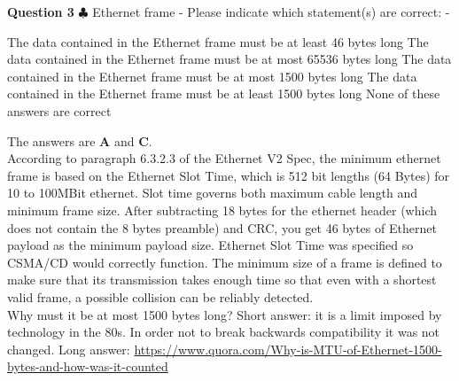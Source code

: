 \documentclass[en]{sourcefiles/eplexam}
\newcounter{choice}
\renewcommand\thechoice{\textbf{\Alph{choice}}}
\newcommand\choicelabel{\thechoice$\quad$}
\newenvironment{choices}%
  {\list{\choicelabel}%
     {\usecounter{choice}\def\makelabel##1{\hss\llap{##1}}%
       \settowidth{\leftmargin}{W.\hskip\labelsep\hskip 2.5em}%
       \def\choice{%
         \item
       } %
       \labelwidth\leftmargin\advance\labelwidth-\labelsep
       \topsep=0pt
       \partopsep=0pt
     }%
  }%
  {\endlist}
\begin{document}
\textbf{Question 3} $\clubsuit$ Ethernet frame - Please indicate which statement(s) are correct:
\begin{choices}
     \choice The data contained in the Ethernet frame must be at least 46 bytes long
     \choice The data contained in the Ethernet frame must be at most 65536 bytes long
     \choice The data contained in the Ethernet frame must be at most 1500 bytes long
     \choice The data contained in the Ethernet frame must be at least 1500 bytes long
     \choice None of these answers are correct
\end{choices}
\begin{solution}
The answers are \textbf{A} and \textbf{C}.\\

 \noindent According to paragraph 6.3.2.3 of the Ethernet V2 Spec, the minimum ethernet frame is based on the Ethernet Slot Time, which is 512 bit lengths (64 Bytes) for 10 to 100MBit ethernet. Slot time governs both maximum cable length and minimum frame size. After subtracting 18 bytes for the ethernet header (which does not contain the 8 bytes preamble) and CRC, you get 46 bytes of Ethernet payload as the minimum payload size. Ethernet Slot Time was specified so CSMA/CD would correctly function. The minimum size of a frame is defined to make sure that its transmission takes enough time so that even with a shortest valid frame, a possible collision can be reliably detected.\\
 
 \noindent Why must it be at most 1500 bytes long? Short answer: it is a limit imposed by technology in the 80s. In order not to break backwards compatibility it was not changed. Long answer:
 \url{https://www.quora.com/Why-is-MTU-of-Ethernet-1500-bytes-and-how-was-it-counted}
\end{solution}
\end{document}
